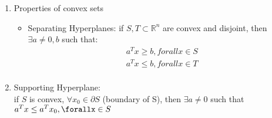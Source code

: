 \documentclass[12pt,letter]{article}
\newcommand{\R}{\mathbb{R}}
\begin{document}
\begin{enumerate}
  \pagebreak
  
\item Properties of convex sets
  \begin{itemize}
  \item Separating Hyperplanes: if $S,T \subset \R^n$ are convex and disjoint, then $\exists a \neq 0, b$ such that:\\
    \begin{align*}
      a^Tx \geq b, forall x \in S\\
      a^Tx \leq b, forall x \in T\\
    \end{align*}
  \end{itemize}
\item Supporting Hyperplane:\\
  if $S$ is convex, $\forall x_0 \in \partial S$ (boundary of S), then $\exists a \neq 0$ such that $a^Tx \leq a^Tx_0, \forallx \in S$\\
\end{enumerate}
\end{document}
